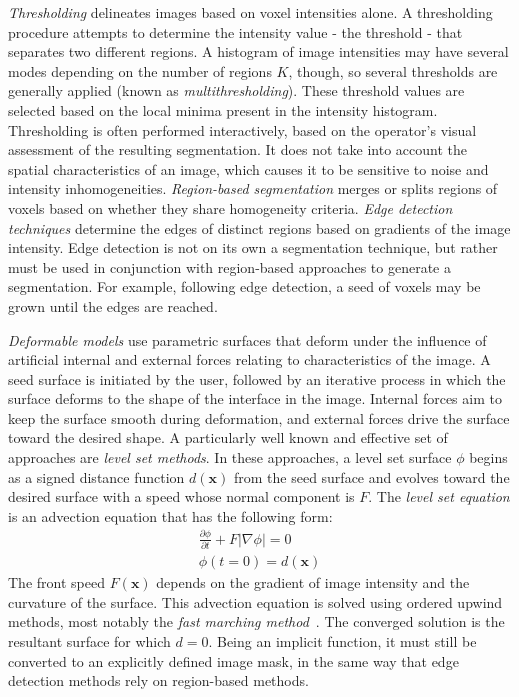 \textit{Thresholding} delineates images based on voxel intensities alone. A thresholding procedure attempts to determine the intensity value - the threshold - that separates two different regions. A histogram of image intensities may have several modes depending on the number of regions $K$, though, so several thresholds are generally applied (known as \textit{multithresholding}). These threshold values are selected based on the local minima present in the intensity histogram. Thresholding is often performed interactively, based on the operator's visual assessment of the resulting segmentation. It does not take into account the spatial characteristics of an image, which causes it to be sensitive to noise and intensity inhomogeneities. \textit{Region-based segmentation} merges or splits regions of voxels based on whether they share homogeneity criteria. \textit{Edge detection techniques} determine the edges of distinct regions based on gradients of the image intensity. Edge detection is not on its own a segmentation technique, but rather must be used in conjunction with region-based approaches to generate a segmentation. For example, following edge detection, a seed of voxels may be grown until the edges are reached.

\textit{Deformable models} use parametric surfaces that deform under the influence of artificial internal and external forces relating to characteristics of the image. A seed surface is initiated by the user, followed by an iterative process in which the surface deforms to the shape of the interface in the image. Internal forces aim to keep the surface smooth during deformation, and external forces drive the surface toward the desired shape. A particularly well known and effective set of approaches are \textit{level set methods}. In these approaches, a level set surface $\phi$ begins as a signed distance function $d(\bm{x})$ from the seed surface and evolves toward the desired surface with a speed whose normal component is $F$. The \textit{level set equation} is an advection equation that has the following form:
\begin{align}
\frac{\partial \phi}{\partial t} + F \left| \nabla \phi \right| = 0 \\
\phi(t=0) = d(\bm{x})
\end{align}
The front speed $F(\bm{x})$ depends on the gradient of image intensity and the curvature of the surface. This advection equation is solved using ordered upwind methods, most notably the \textit{fast marching method}~\cite{malladi_1995, sethian_1996}. The converged solution is the resultant surface for which $d = 0$. Being an implicit function, it must still be converted to an explicitly defined image mask, in the same way that edge detection methods rely on region-based methods.

